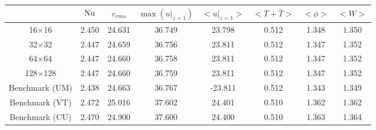 \begin{tabular}{c|ccccccc}
    & $\mathrm{Nu}$ & $v_{rms}$ & $\max(u|_{z=1})$ & $<u|_{z=1}>$ & $<T + \bar{T}>$ & $<\phi>$ & $<W>$ \\
\hline
16$\times$16 & 2.450 & 24.631 & 36.749 & 23.798 & 0.512 & 1.348 & 1.350 \\
32$\times$32 & 2.447 & 24.659 & 36.756 & 23.811 & 0.512 & 1.347 & 1.352 \\
64$\times$64 & 2.447 & 24.660 & 36.758 & 23.811 & 0.512 & 1.347 & 1.352 \\
128$\times$128 & 2.447 & 24.660 & 36.759 & 23.811 & 0.512 & 1.347 & 1.352 \\
\hline
Benchmark (UM) & 2.438 & 24.663 & 36.767 & -23.811 & 0.512 & 1.343 & 1.349 \\
Benchmark (VT) & 2.472 & 25.016 & 37.602 & 24.401 & 0.510 & 1.362 & 1.362 \\
Benchmark (CU) & 2.470 & 24.900 & 37.600 & 24.400 & 0.510 & 1.363 & 1.364 \\
\end{tabular}
